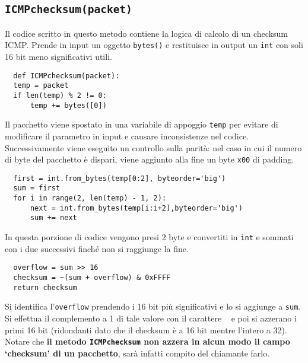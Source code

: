 \documentclass[a4paper,12pt]{report}
\begin{document}
\subsection*{\texttt{ICMPchecksum(packet)}}
Il codice scritto in questo metodo contiene la logica di calcolo di un checksum ICMP.
%
Prende in input un oggetto \texttt{bytes()} e restituisce in output un \texttt{int} con soli 16 bit meno significativi utili.
%
\begin{verbatim}
  def ICMPchecksum(packet):
  temp = packet
  if len(temp) % 2 != 0:
      temp += bytes([0])
\end{verbatim}
Il pacchetto viene spostato in una variabile di appoggio \texttt{temp} per evitare di modificare il parametro in input e causare inconsistenze nel codice.
%
\\ Successivamente viene eseguito un controllo sulla parità: nel caso in cui il numero di byte del pacchetto è dispari, viene aggiunto alla fine un byte \texttt{x00} di padding.
\begin{verbatim}
  first = int.from_bytes(temp[0:2], byteorder='big')
  sum = first
  for i in range(2, len(temp) - 1, 2):
      next = int.from_bytes(temp[i:i+2],byteorder='big')
      sum += next
\end{verbatim}
In questa porzione di codice vengono presi 2 byte e convertiti in \texttt{int} e sommati con i due successivi finché non si raggiunge la fine.
\begin{verbatim}
  overflow = sum >> 16
  checksum = ~(sum + overflow) & 0xFFFF
  return checksum
\end{verbatim}
Si identifica l'\texttt{overflow} prendendo i 16 bit più significativi e lo si aggiunge a \texttt{sum}. Si effettua il complemento a 1 di tale valore con il carattere \texttt{~} e poi si azzerano i primi 16 bit (ridondanti dato che il checksum è a 16 bit mentre l'intero a 32).
%
\\ Notare che \textbf{il metodo \texttt{ICMPchecksum} non azzera in alcun modo il campo `checksum' di un pacchetto}, sarà infatti compito del chiamante farlo.
\end{document}
